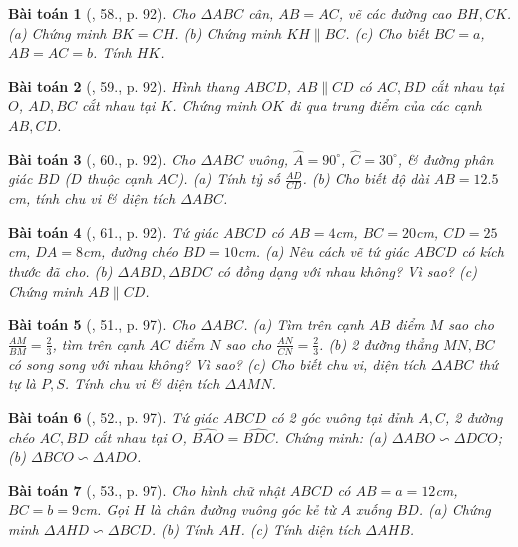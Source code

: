 \documentclass{article}
\newtheorem{baitoan}{Bài toán}
\begin{document}
\begin{baitoan}[\cite{SGK_Toan_8_tap_2}, 58., p. 92]
	Cho $\Delta ABC$ cân, $AB = AC$, vẽ các đường cao $BH,CK$. (a) Chứng minh $BK = CH$. (b) Chứng minh $KH\parallel BC$. (c) Cho biết $BC = a$, $AB = AC = b$. Tính $HK$.
\end{baitoan}

\begin{baitoan}[\cite{SGK_Toan_8_tap_2}, 59., p. 92]
	Hình thang $ABCD$, $AB\parallel CD$ có $AC,BD$ cắt nhau tại $O$, $AD,BC$ cắt nhau tại $K$. Chứng minh $OK$ đi qua trung điểm của các cạnh $AB,CD$.
\end{baitoan}

\begin{baitoan}[\cite{SGK_Toan_8_tap_2}, 60., p. 92]
	Cho $\Delta ABC$ vuông, $\widehat{A} = 90^\circ$, $\widehat{C} = 30^\circ$, \& đường phân giác $BD$ ($D$ thuộc cạnh $AC$). (a) Tính tỷ số $\frac{AD}{CD}$. (b) Cho biết độ dài $AB = 12.5$\emph{cm}, tính chu vi \& diện tích $\Delta ABC$.
\end{baitoan}

\begin{baitoan}[\cite{SGK_Toan_8_tap_2}, 61., p. 92]
	Tứ giác $ABCD$ có $AB = 4$\emph{cm}, $BC = 20$\emph{cm}, $CD = 25$\emph{cm}, $DA = 8$\emph{cm}, đường chéo $BD = 10$\emph{cm}. (a) Nêu cách vẽ tứ giác $ABCD$ có kích thước đã cho. (b) $\Delta ABD,\Delta BDC$ có đồng dạng với nhau không? Vì sao? (c) Chứng minh $AB\parallel CD$.	
\end{baitoan}

\begin{baitoan}[\cite{SBT_Toan_8_tap_2}, 51., p. 97]
	Cho $\Delta ABC$. (a) Tìm trên cạnh $AB$ điểm $M$ sao cho $\frac{AM}{BM} = \frac{2}{3}$, tìm trên cạnh $AC$ điểm $N$ sao cho $\frac{AN}{CN} = \frac{2}{3}$. (b) 2 đường thẳng $MN,BC$ có song song với nhau không? Vì sao? (c) Cho biết chu vi, diện tích $\Delta ABC$ thứ tự là $P,S$. Tính chu vi \& diện tích $\Delta AMN$.
\end{baitoan}

\begin{baitoan}[\cite{SBT_Toan_8_tap_2}, 52., p. 97]
	Tứ giác $ABCD$ có 2 góc vuông tại đỉnh $A,C$, 2 đường chéo $AC,BD$ cắt nhau tại $O$, $\widehat{BAO} = \widehat{BDC}$. Chứng minh: (a) $\Delta ABO\backsim\Delta DCO$; (b) $\Delta BCO\backsim\Delta ADO$.
\end{baitoan}

\begin{baitoan}[\cite{SBT_Toan_8_tap_2}, 53., p. 97]
	Cho hình chữ nhật $ABCD$ có $AB = a = 12$\emph{cm}, $BC = b = 9$\emph{cm}. Gọi $H$ là chân đường vuông góc kẻ từ $A$ xuống $BD$. (a) Chứng minh $\Delta AHD\backsim\Delta BCD$. (b) Tính $AH$. (c) Tính diện tích $\Delta AHB$.
\end{baitoan}
\end{document}
